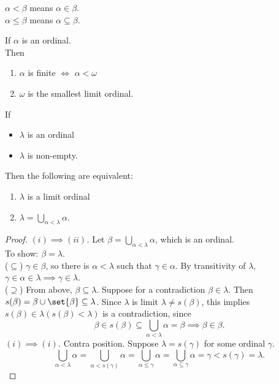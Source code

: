 \newpage
\begin{notation}
    $\alpha < \beta$ means $\alpha \in \beta$.\\
    $\alpha \leq \beta$ means $\alpha \subseteq \beta$.
\end{notation}

\begin{exercise}
    If $\alpha$ is an ordinal.\\
    Then 
    \begin{enumerate}[label=(\roman*)]
        \item $\alpha$ is finite $\iff$ $\alpha < \omega$
        \item $\omega$ is the smallest limit ordinal.
    \end{enumerate}
\end{exercise}

\begin{proposition}
    If 
    \begin{itemize}
        \item $\lambda$ is an ordinal
        \item $\lambda$ is non-empty.
    \end{itemize}
    Then the following are equivalent:
    \begin{enumerate}[label=(\roman*)]
        \item $\lambda$ is a limit ordinal
        \item $\lambda = \bigcup\limits_{\alpha < \lambda} \alpha$.
    \end{enumerate}
\end{proposition}
\begin{proof}
    \emph{$(i) \implies (ii)$.} Let $\beta = \bigcup\limits_{\alpha < \lambda} \alpha$, which is an ordinal.\\
    To show: $\beta = \lambda.$\\
    ($\subseteq$) $\gamma \in \beta$, so there is $\alpha < \lambda$ such that $\gamma \in \alpha$. 
    By transitivity of $\lambda$, $\gamma \in \alpha \in \lambda \implies \gamma \in \lambda$.\\
    ($\supseteq$) From above, $\beta \subseteq \lambda$. Suppose for a contradiction $\beta \in \lambda$.
    Then $s(\beta) = \beta \cup \set{\beta} \subseteq \lambda$. Since $\lambda$ is limit $\lambda \ne s(\beta)$, 
    this implies $s(\beta) \in \lambda (s(\beta) < \lambda)$ is a contradiction, since 
    $$ \beta \in s(\beta) \subseteq \bigcup_{\alpha < \lambda} \alpha = \beta \implies \beta \in \beta. $$
    \emph{$(i) \implies (i)$.} Contra position. Suppose $\lambda = s(\gamma)$ for some ordinal $\gamma$.
    $$ \bigcup_{\alpha < \lambda} \alpha = \bigcup_{\alpha < s(\gamma)} \alpha = \bigcup_{\alpha \leq \gamma} \alpha
        = \bigcup_{\alpha \subseteq \gamma} \alpha = \gamma < s(\gamma) = \lambda.$$
\end{proof}

